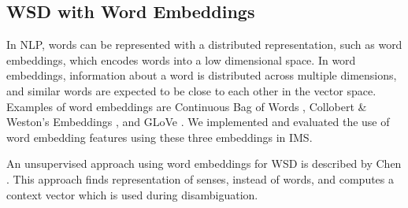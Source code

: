 \subsection{WSD with Word Embeddings}

In NLP, words can be represented 
with a distributed representation, such as word embeddings, which encodes
words into a low dimensional space. In word embeddings, information
about a word is distributed across multiple dimensions, and similar
words are expected to be close to each other in the vector space. Examples of word
embeddings are Continuous Bag of Words \cite{mikolovword2vec},
Collobert \& Weston's Embeddings \cite{collobert2008unified}, and
GLoVe \cite{pennington2014glove}. We implemented and evaluated the use
of word embedding features using these three embeddings in IMS.


An unsupervised approach using word embeddings for WSD is described by Chen . This approach finds representation of senses, instead of words, and computes a context vector which is used during disambiguation. 

